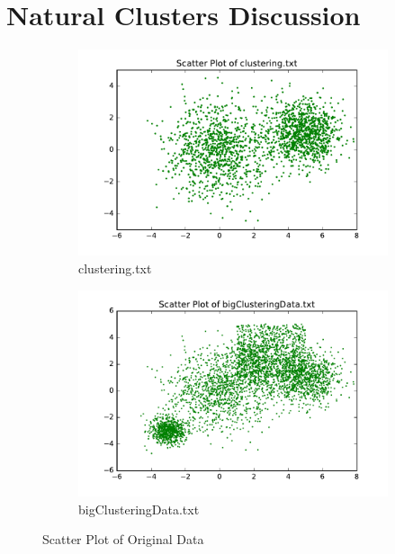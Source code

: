 \section{\Large Natural Clusters Discussion}

\begin{figure}[H]
\centering
\centering
        \begin{subfigure}[b]{0.49\textwidth}
            \centering
            \includegraphics[width=\textwidth]{./figures/clustering_scatter.pdf}
            \caption{clustering.txt}\label{fig:16a}
        \end{subfigure}
        \hfill
        \begin{subfigure}[b]{0.49\textwidth}  
            \centering 
            \includegraphics[width=\textwidth]{./figures/bigClustering_scatter.pdf}
            \caption{bigClusteringData.txt}\label{fig:16b}
        \end{subfigure}
\caption{Scatter Plot of Original Data}
\label{fig:clusters} 
\end{figure}

